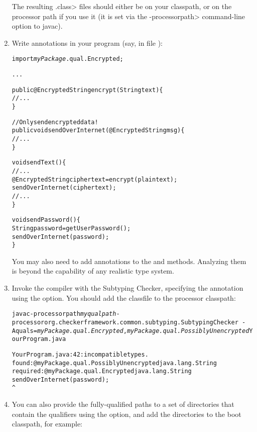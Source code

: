 \begin{enumerate}
The resulting \<.class> files should either be on your classpath, or on the
processor path if you use it (it is set via the \<-processorpath> command-line option to javac).

\item
  Write  annotations in your program (say, in file
  ):

\begin{alltt}
import \textit{myPackage}.qual.Encrypted;

...

public @Encrypted String encrypt(String text) \{
    // ...
\}

// Only send encrypted data!
public void sendOverInternet(@Encrypted String msg) \{
    // ...
\}

void sendText() \{
    // ...
    @Encrypted String ciphertext = encrypt(plaintext);
    sendOverInternet(ciphertext);
    // ...
\}

void sendPassword() \{
    String password = getUserPassword();
    sendOverInternet(password);
\}
\end{alltt}

You may also need to add  annotations to the
 and  methods.  Analyzing them is beyond the
capability of any realistic type system.

\item
  Invoke the compiler with the Subtyping Checker, specifying the
   annotation using the  option.
  You should add the  classfile to the processor classpath:

\begin{alltt}
  javac -processorpath \textit{myqualpath} -processor org.checkerframework.common.subtyping.SubtypingChecker \
        -Aquals=\textit{myPackage.qual.Encrypted},\textit{myPackage.qual.PossiblyUnencrypted} YourProgram.java

YourProgram.java:42: incompatible types.
found   : @myPackage.qual.PossiblyUnencrypted java.lang.String
required: @myPackage.qual.Encrypted java.lang.String
    sendOverInternet(password);
                     ^
\end{alltt}

\item
You can also provide the fully-qualified paths to a set of directories
that contain the qualifiers using the \code{-AqualDirs} option, and add
the directories to the boot classpath, for example:


\end{enumerate}
